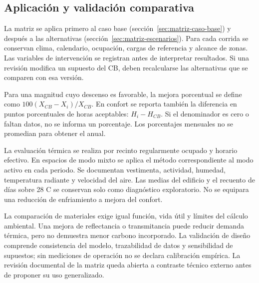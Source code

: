 \subsection{Aplicación y validación comparativa}
La matriz se aplica primero al caso base (sección~\ref{sec:matriz-caso-base}) y después a las alternativas (sección~\ref{sec:matriz-escenarios}). Para cada corrida se conservan clima, calendario, ocupación, cargas de referencia y alcance de zonas. Las variables de intervención se registran antes de interpretar resultados. Si una revisión modifica un supuesto del CB, deben recalcularse las alternativas que se comparen con esa versión.

Para una magnitud cuyo descenso es favorable, la mejora porcentual se define como $100(X_{CB}-X_i)/X_{CB}$. En confort se reporta también la diferencia en puntos porcentuales de horas aceptables: $H_i-H_{CB}$. Si el denominador es cero o faltan datos, no se informa un porcentaje. Los porcentajes mensuales no se promedian para obtener el anual.

La evaluación térmica se realiza por recinto regularmente ocupado y horario efectivo. En espacios de modo mixto se aplica el método correspondiente al modo activo en cada periodo. Se documentan vestimenta, actividad, humedad, temperatura radiante y velocidad del aire. Las medias del edificio y el recuento de días sobre 28 \textdegree C se conservan solo como diagnóstico exploratorio. No se equipara una reducción de enfriamiento a mejora del confort.

La comparación de materiales exige igual función, vida útil y límites del cálculo ambiental. Una mejora de reflectancia o transmitancia puede reducir demanda térmica, pero no demuestra menor carbono incorporado. La validación de diseño comprende consistencia del modelo, trazabilidad de datos y sensibilidad de supuestos; sin mediciones de operación no se declara calibración empírica. La revisión documental de la matriz queda abierta a contraste técnico externo antes de proponer su uso generalizado.
